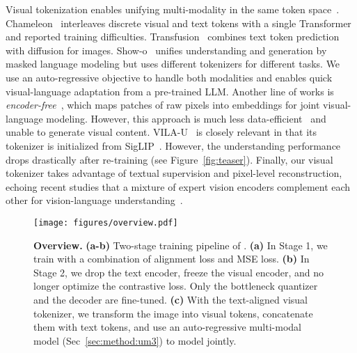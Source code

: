 Visual tokenization enables unifying multi-modality in the same token space~\cite{lu2022unifiedio,lu2024unifiedio2,wu2024nextgpt,jin2024lavit,wang2024emu3,team2024chameleon,zhou2024transfusion}.
Chameleon~\cite{team2024chameleon} interleaves discrete visual and text tokens with a single Transformer and reported training difficulties.
Transfusion~\cite{zhou2024transfusion} combines text token prediction with diffusion for images.
Show-o~\cite{xie2024showo} unifies understanding and generation by masked language modeling but uses different tokenizers for different tasks.
We use an auto-regressive objective to handle both modalities and \ours enables quick visual-language adaptation from a pre-trained LLM.
Another line of works is \emph{encoder-free}~\cite{fuyu-8b,diao2024eve}, which maps patches of raw pixels into embeddings for joint visual-language modeling.
However, this approach is much less data-efficient~\cite{beyer2024paligemma} and unable to generate visual content.
VILA-U~\cite{wu2024vilau} is closely relevant in that its tokenizer is initialized from SigLIP~\cite{zhai2023siglip}.
However, the understanding performance drops drastically after re-training (see Figure~\ref{fig:teaser}).
Finally, our visual tokenizer takes advantage of textual supervision and pixel-level reconstruction, echoing recent studies that a mixture of expert vision encoders complement each other for vision-language understanding~\cite{tong2024cambrian,shi2024eagle}.

\begin{figure*}[!tb]
    \centering
    \texttt{[image: figures/overview.pdf]}
    \vspace{-10pt}
    \caption{
    \textbf{Overview.}
    \textbf{(a-b)} Two-stage training pipeline of \ours.
    \textbf{(a)} In Stage 1, we train \ours with a combination of alignment loss and MSE loss.
    \textbf{(b)} In Stage 2, we drop the text encoder, freeze the visual encoder, and no longer optimize the contrastive loss.
    Only the bottleneck quantizer and the decoder are fine-tuned.
    \textbf{(c)} With the text-aligned visual tokenizer, we transform the image into visual tokens, concatenate them with text tokens, and use an auto-regressive multi-modal model (Sec~\ref{sec:method:um3}) to model jointly.
    }
    \label{fig:overview}
\end{figure*}